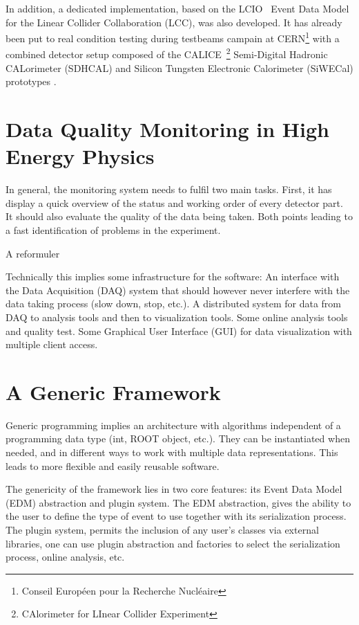 \documentclass[conference]{IEEEtran}
\begin{document}
In addition, a dedicated implementation, based on the LCIO~\cite{LCIO} Event Data Model for the Linear Collider Collaboration (LCC), was also developed. It has already been put to real condition testing during testbeams campain at CERN\footnote{Conseil Européen pour la Recherche Nucléaire} with a combined detector setup composed of the CALICE~\footnote{CAlorimeter for LInear Collider Experiment} Semi-Digital Hadronic CALorimeter (SDHCAL) and Silicon Tungsten Electronic Calorimeter (SiWECal) prototypes .

\section{Data Quality Monitoring in High Energy Physics}
In general, the monitoring system needs to fulfil two main tasks. First, it has display a quick overview of the status and working order of every detector part. It should also evaluate the quality of the data being taken. Both points leading to a fast identification of problems in the experiment.

{\color{red} A reformuler

Technically this implies some infrastructure for the software:
An interface with the Data Acquisition (DAQ) system that should however never interfere with the data taking process (slow down, stop, etc.). A distributed system for data from DAQ to analysis tools and then to visualization tools. Some online analysis tools and quality test. Some Graphical User Interface (GUI) for data visualization with multiple client access.}

\section{A Generic Framework}

Generic programming implies an architecture with algorithms independent of a programming data type (int, ROOT object, etc.). They can be instantiated when needed, and in different ways to work with multiple data representations. This leads to more flexible and easily reusable software.

The genericity of the framework lies in two core features: its Event Data Model (EDM) abstraction and plugin system.
The EDM abstraction, gives the ability to the user to define the type of event to use together with its serialization process. The plugin system, permits the inclusion of any user's classes via external libraries, one can use plugin abstraction and factories to select the serialization process, online analysis, etc.
\end{document}
